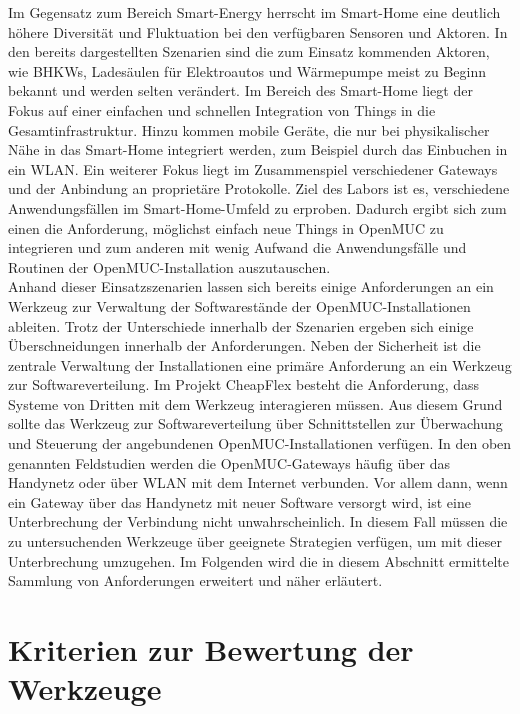 Im Gegensatz zum Bereich Smart-Energy herrscht im Smart-Home eine deutlich höhere Diversität und Fluktuation bei den verfügbaren Sensoren und Aktoren. In den bereits dargestellten Szenarien 
sind die zum Einsatz kommenden Aktoren, wie \acp{BHKW}, Ladesäulen für Elektroautos und Wärmepumpe meist zu Beginn bekannt und werden selten verändert.
Im Bereich des Smart-Home liegt der Fokus auf einer einfachen und schnellen Integration von Things in die Gesamtinfrastruktur. Hinzu kommen mobile Geräte, die nur 
bei physikalischer Nähe in das Smart-Home integriert werden, zum Beispiel durch das Einbuchen in ein \ac{WLAN}.
Ein weiterer Fokus liegt im Zusammenspiel verschiedener Gateways und der Anbindung an proprietäre Protokolle.
Ziel des Labors ist es, verschiedene Anwendungsfällen im Smart-Home-Umfeld zu erproben. 
Dadurch ergibt sich zum einen die Anforderung, möglichst einfach neue Things in OpenMUC zu integrieren und zum anderen mit wenig Aufwand
die Anwendungsfälle und Routinen der OpenMUC-Installation auszutauschen. \\

Anhand dieser Einsatzszenarien lassen sich bereits einige Anforderungen an ein Werkzeug zur Verwaltung der Softwarestände der OpenMUC-Installationen ableiten.
Trotz der Unterschiede innerhalb der Szenarien ergeben sich einige Überschneidungen innerhalb der Anforderungen.
Neben der Sicherheit ist die zentrale Verwaltung der Installationen eine primäre Anforderung an ein Werkzeug zur Softwareverteilung. 
Im Projekt CheapFlex besteht die Anforderung, dass Systeme von Dritten mit dem Werkzeug interagieren müssen. 
Aus diesem Grund sollte das Werkzeug zur Softwareverteilung über Schnittstellen zur Überwachung und Steuerung der angebundenen OpenMUC-Installationen verfügen.
In den oben genannten Feldstudien werden die OpenMUC-Gateways häufig über das Handynetz oder über \ac{WLAN} mit dem Internet verbunden.
Vor allem dann, wenn ein Gateway über das Handynetz mit neuer Software versorgt wird, ist eine Unterbrechung der Verbindung nicht unwahrscheinlich.
In diesem Fall müssen die zu untersuchenden Werkzeuge über geeignete Strategien verfügen, um mit dieser Unterbrechung umzugehen.
Im Folgenden wird die in diesem Abschnitt ermittelte Sammlung von Anforderungen erweitert und näher erläutert.

\section{Kriterien zur Bewertung der Werkzeuge}

